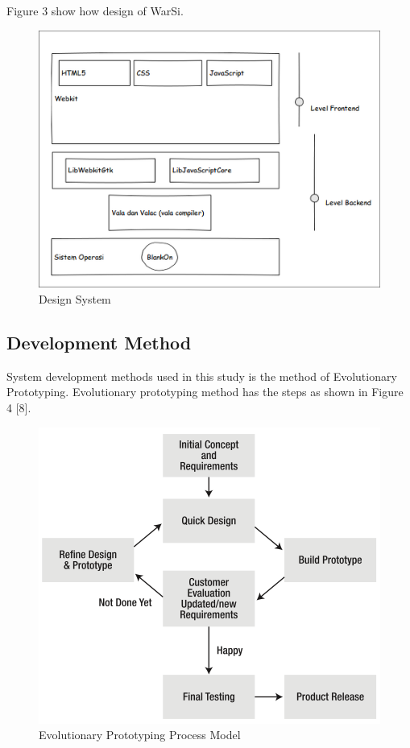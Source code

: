 \documentclass[conference, letterpaper]{IEEEtran}
\begin{document}
Figure 3 show how design of WarSi.

\begin{figure}[!t]
\centering
\includegraphics[scale=0.5]{image/DesignSystem.png}
\caption{Design System}
\end{figure}

\subsection{Development Method}
System development methods used in this study is the method of Evolutionary Prototyping. Evolutionary prototyping method has the steps as shown in Figure 4 [8].

\begin{figure}[!t]
\centering
\includegraphics[scale=0.5]{image/ep-model.png}
\caption{Evolutionary Prototyping Process Model}
\end{figure}
\end{document}
